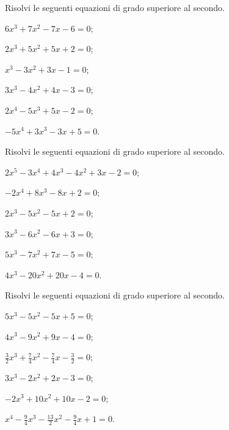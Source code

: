 \begin{esercizio}[\Ast]
 \label{ese:5.52}
Risolvi le seguenti equazioni di grado superiore al secondo.
\begin{multicols}{2}
\begin{enumeratea}
\item $6x^3+7x^2-7x-6=0$;
\item $2x^3+5x^2+5x+2=0$;
\item $x^3-3x^2+3x-1=0$;
\item $3x^3-4x^2+4x-3=0$;
\item $2x^4-5x^3+5x-2=0$;
\item $-5x^4+3x^3-3x+5=0$.
\end{enumeratea}
\end{multicols}
\end{esercizio}

\begin{esercizio}[\Ast]
 \label{ese:5.53}
Risolvi le seguenti equazioni di grado superiore al secondo.
\begin{multicols}{2}
\begin{enumeratea}
\item $2x^5-3x^4+4x^3-4x^2+3x-2=0$;
\item $-2x^4+8x^3-8x+2=0$;
\item $2x^3-5x^2-5x+2=0$;
\item $3x^3-6x^2-6x+3=0$;
\item $5x^3-7x^2+7x-5=0$;
\item $4x^3-20x^2+20x-4=0$.
\end{enumeratea}
\end{multicols}
\end{esercizio}

\begin{esercizio}[\Ast]
 \label{ese:5.54}
Risolvi le seguenti equazioni di grado superiore al secondo.
\begin{multicols}{2}
\begin{enumeratea}
\item $5x^3-5x^2-5x+5=0$;
\item $4x^3-9x^2+9x-4=0$;
\item $\frac 3 2x^3+\frac 7 4x^2-\frac 7 4x-\frac 3 2=0$;
\item $3x^3-2x^2+2x-3=0$;
\item $-2x^3+10x^2+10x-2=0$;
\item $x^4-\frac 9 4x^3-\frac{13} 2x^2-\frac 9 4x+1=0$.
\end{enumeratea}
\end{multicols}
\end{esercizio}
\pagebreak

